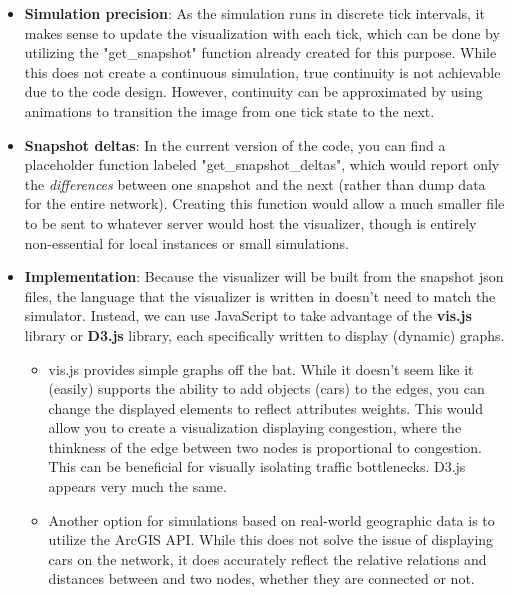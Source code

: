 \begin{itemize}
    \item \textbf{Simulation precision}:  As the simulation runs in discrete tick intervals, it makes sense to update the visualization with each tick, which can be done by utilizing the "get\_snapshot" function already created for this purpose.  While this does not create a continuous simulation, true continuity is not achievable due to the code design.  However, continuity can be approximated by using animations to transition the image from one tick state to the next.
    \item \textbf{Snapshot deltas}:  In the current version of the code, you can find a placeholder function labeled "get\_snapshot\_deltas", which would report only the \textit{differences} between one snapshot and the next (rather than dump data for the entire network).  Creating this function would allow a much smaller file to be sent to whatever server would host the visualizer, though is entirely non-essential for local instances or small simulations.
    \item \textbf{Implementation}:  Because the visualizer will be built from the snapshot json files, the language that the visualizer is written in doesn't need to match the simulator.  Instead, we can use JavaScript to take advantage of the \textbf{vis.js} library or \textbf{D3.js} library, each specifically written to display (dynamic) graphs.
        \begin{itemize}
            \item vis.js provides simple graphs off the bat.  While it doesn't seem like it (easily) supports the ability to add objects (cars) to the edges, you can change the displayed elements to reflect attributes weights.  This would allow you to create a visualization displaying congestion, where the thinkness of the edge between two nodes is proportional to congestion.  This can be beneficial for visually isolating traffic bottlenecks. D3.js appears very much the same.
            \item Another option for simulations based on real-world geographic data is to utilize the ArcGIS API.  While this does not solve the issue of displaying cars on the network, it does accurately reflect the relative relations and distances between and two nodes, whether they are connected or not.
        \end{itemize}
\end{itemize}